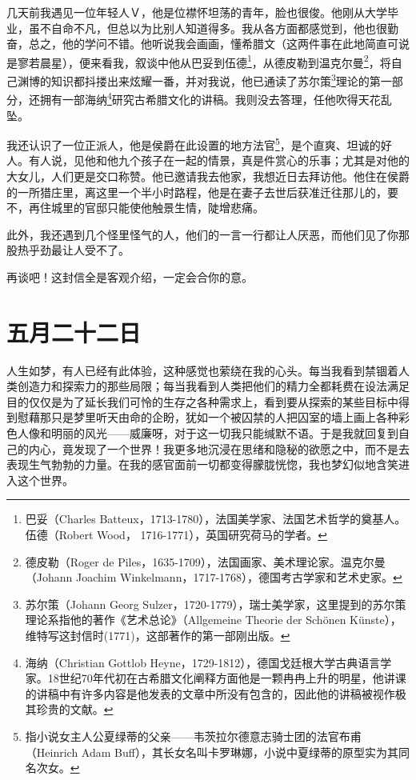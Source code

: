 \documentclass[12pt,oneside]{book}
\begin{document}
几天前我遇见一位年轻人Ｖ，他是位襟怀坦荡的青年，脸也很俊。他刚从大学毕业，虽不自命不凡，但总以为比别人知道得多。我从各方面都感觉到，他也很勤奋，总之，他的学问不错。他听说我会画画，懂希腊文（这两件事在此地简直可说是寥若晨星），便来看我，叙谈中他从巴妥到伍德\footnote{巴妥（Charles Batteux，1713-1780），法国美学家、法国艺术哲学的奠基人。伍德（Robert Wood， 1716-1771），英国研究荷马的学者。}，从德皮勒到温克尔曼\footnote{德皮勒（Roger de Piles，1635-1709），法国画家、美术理论家。温克尔曼（Johann Joachim Winkelmann，1717-1768），德国考古学家和艺术史家。}，将自己渊博的知识都抖搂出来炫耀一番，并对我说，他已通读了苏尔策\footnote{苏尔策（Johann Georg Sulzer，1720-1779），瑞士美学家，这里提到的苏尔策理论系指他的著作《艺术总论》（Allgemeine Theorie der Schönen Künste），维特写这封信时(1771)，这部著作的第一部刚出版。}理论的第一部分，还拥有一部海纳\footnote{海纳（Christian Gottlob Heyne，1729-1812），德国戈廷根大学古典语言学家。18世纪70年代初在古希腊文化阐释方面他是一颗冉冉上升的明星，他讲课的讲稿中有许多内容是他发表的文章中所没有包含的，因此他的讲稿被视作极其珍贵的文献。}研究古希腊文化的讲稿。我则没去答理，任他吹得天花乱坠。

我还认识了一位正派人，他是侯爵在此设置的地方法官\footnote{指小说女主人公夏绿蒂的父亲——韦茨拉尔德意志骑士团的法官布甫（Heinrich Adam Buff），其长女名叫卡罗琳娜，小说中夏绿蒂的原型实为其同名次女。}，是个直爽、坦诚的好人。有人说，见他和他九个孩子在一起的情景，真是件赏心的乐事；尤其是对他的大女儿，人们更是交口称赞。他已邀请我去他家，我想近日去拜访他。他住在侯爵的一所猎庄里，离这里一个半小时路程，他是在妻子去世后获准迁往那儿的，要不，再住城里的官邸只能使他触景生情，陡增悲痛。

此外，我还遇到几个怪里怪气的人，他们的一言一行都让人厌恶，而他们见了你那股热乎劲最让人受不了。

再谈吧！这封信全是客观介绍，一定会合你的意。

\chapter{五月二十二日}
\label{sec-2-7}
人生如梦，有人已经有此体验，这种感觉也萦绕在我的心头。每当我看到禁锢着人类创造力和探索力的那些局限；每当我看到人类把他们的精力全都耗费在设法满足目的仅仅是为了延长我们可怜的生存之各种需求上，看到要从探索的某些目标中得到慰藉那只是梦里听天由命的企盼，犹如一个被囚禁的人把囚室的墙上画上各种彩色人像和明丽的风光——威廉呀，对于这一切我只能缄默不语。于是我就回复到自己的内心，竟发现了一个世界！我更多地沉浸在思绪和隐秘的欲愿之中，而不是去表现生气勃勃的力量。在我的感官面前一切都变得朦胧恍惚，我也梦幻似地含笑进入这个世界。
\end{document}
